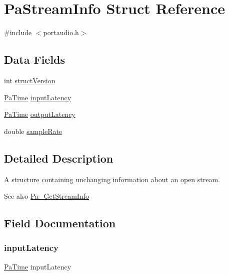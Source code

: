 \hypertarget{struct_pa_stream_info}{}\section{Pa\+Stream\+Info Struct Reference}
\label{struct_pa_stream_info}


{\ttfamily \#include $<$portaudio.\+h$>$}

\subsection*{Data Fields}
\begin{DoxyCompactItemize}
\item 
int \hyperlink{struct_pa_stream_info_a427b2098449590745eb8e4443f0b4ef8}{struct\+Version}
\item 
\hyperlink{portaudio_8h_af17a7e6d0471a23071acf8dbd7bbe4bd}{Pa\+Time} \hyperlink{struct_pa_stream_info_aa0e030ab4509b04de956e324d28d878f}{input\+Latency}
\item 
\hyperlink{portaudio_8h_af17a7e6d0471a23071acf8dbd7bbe4bd}{Pa\+Time} \hyperlink{struct_pa_stream_info_ae85fa64f5671c4acd548908a56f9f451}{output\+Latency}
\item 
double \hyperlink{struct_pa_stream_info_a2bd79d2ab2dfb6aeaf75c2878ad30e1f}{sample\+Rate}
\end{DoxyCompactItemize}


\subsection{Detailed Description}
A structure containing unchanging information about an open stream. \begin{DoxySeeAlso}{See also}
\hyperlink{portaudio_8h_a3d9c4cbda4e9f381b76f287c3de8a758}{Pa\+\_\+\+Get\+Stream\+Info} 
\end{DoxySeeAlso}


\subsection{Field Documentation}
\mbox{\label{struct_pa_stream_info_aa0e030ab4509b04de956e324d28d878f}} 
\subsubsection{\texorpdfstring{input\+Latency}{inputLatency}}
{\footnotesize\ttfamily \hyperlink{portaudio_8h_af17a7e6d0471a23071acf8dbd7bbe4bd}{Pa\+Time} input\+Latency}

